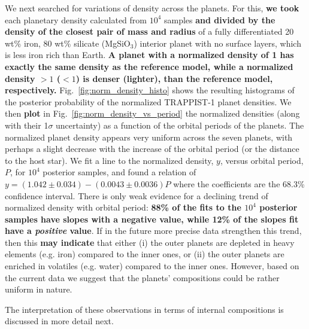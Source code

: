 \documentclass[twocolumn]{aastex63}
\begin{document}
We next searched for variations of density across the planets. For this, \textbf{we took} each planetary density calculated from $10^4$ samples \textbf{and divided by the density of the closest pair of mass and radius} of a fully differentiated 20 wt\% iron, 80 wt\% silicate (MgSiO$_3$) interior planet with no surface layers, which is less iron rich than Earth.  \textbf{A planet with a normalized density of 1 has exactly the same density as the reference model, while a normalized density ${>}1$ (${<}1$) is denser (lighter), than the reference model, respectively.}
Fig.~\ref{fig:norm_density_histo} shows the resulting histograms of the posterior probability of the normalized TRAPPIST-1 planet densities. We then \textbf{plot} in Fig.~\ref{fig:norm_density_vs_period} the normalized densities (along with their 1$\sigma$ uncertainty) as a function of the orbital periods of the planets.  The normalized planet density appears very uniform across the seven planets, with perhaps a slight decrease with the increase of the orbital period (or the distance to the host star).  We fit a line to the normalized density, $y$, versus orbital period, $P$, for $10^4$ posterior samples, and found a relation of \textbf{$y=(1.042{\pm}0.034){-}(0.0043{\pm}0.0036)P$} where the
coefficients are the 68.3\% confidence interval. There is only weak evidence for a declining trend of normalized density with orbital period: \textbf{88\% of the fits to the $10^4$ posterior samples have slopes with a negative value, while 12\% of the slopes fit have a \emph{positive} value}.  If in the future more precise data strengthen this trend, then
this \textbf{may indicate} that either (i) the outer planets are depleted in heavy elements (e.g. iron) compared to the inner ones, or (ii) the outer planets are enriched in volatiles (e.g. water) compared to the inner ones.  However, based on the current data we suggest that the planets' compositions could be rather uniform in nature.

The interpretation of these observations in terms of internal compositions is discussed in more detail next.
\end{document}
